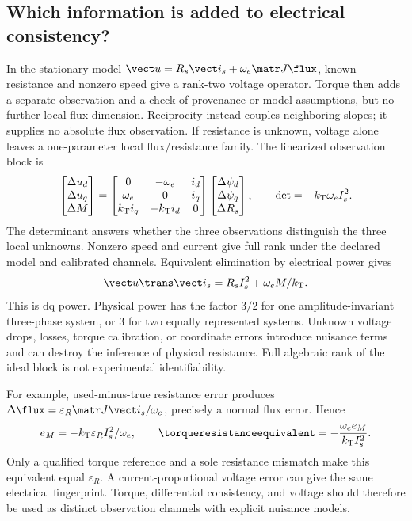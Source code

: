 \subsection{Which information is added to electrical consistency?}
\label{sec:combined-torque-information}
In the stationary model $\vect u=R_s\vect i_s+\omega_e\matr J\flux$,
known resistance and nonzero speed give a rank-two voltage operator.
Torque then adds a separate observation and a check of provenance or
model assumptions, but no further local flux dimension. Reciprocity instead
couples neighboring slopes; it supplies no absolute flux observation.
If resistance is unknown, voltage alone leaves a one-parameter local
flux/resistance family. The linearized observation block is
\begin{equation}
 \begin{bmatrix}\Delta u_d\\\Delta u_q\\\Delta M\end{bmatrix}
 =
 \begin{bmatrix}
 0&-\omega_e&i_d\\
 \omega_e&0&i_q\\
 k_{\rm T}i_q&-k_{\rm T}i_d&0
 \end{bmatrix}
 \begin{bmatrix}\Delta\psi_d\\\Delta\psi_q\\\Delta R_s\end{bmatrix},
 \qquad \det=-k_{\rm T}\omega_e I_s^2 .
 \label{eq:joint-torque-voltage-rank}
\end{equation}
The determinant answers whether the three observations distinguish the
three local unknowns. Nonzero speed and current give full rank under the
declared model and calibrated channels. Equivalent elimination by
electrical power gives
\begin{equation}
 \vect u\trans\vect i_s=R_s I_s^2+\omega_e M/k_{\rm T}.
 \label{eq:torque-power-information}
\end{equation}
This is dq power. Physical power has the factor $3/2$ for one
amplitude-invariant three-phase system, or $3$ for two equally represented
systems.
Unknown voltage drops, losses, torque calibration, or coordinate errors
introduce nuisance terms and can destroy the inference of physical resistance.
Full algebraic rank of the ideal block is not experimental identifiability.

For example, used-minus-true resistance error produces
$\Delta\flux=\varepsilon_R\matr J\vect i_s/\omega_e$, precisely a
normal flux error. Hence
\begin{equation}
 e_M=-k_{\rm T}\varepsilon_R I_s^2/\omega_e,\qquad
 \torqueresistanceequivalent=-\frac{\omega_e e_M}{k_{\rm T}I_s^2}.
 \label{eq:torque-resistance-equivalent}
\end{equation}
Only a qualified torque reference and a sole resistance mismatch make
this equivalent equal $\varepsilon_R$. A current-proportional voltage
error can give the same electrical fingerprint. Torque, differential
consistency, and voltage should therefore be used as distinct observation
channels with explicit nuisance models.

